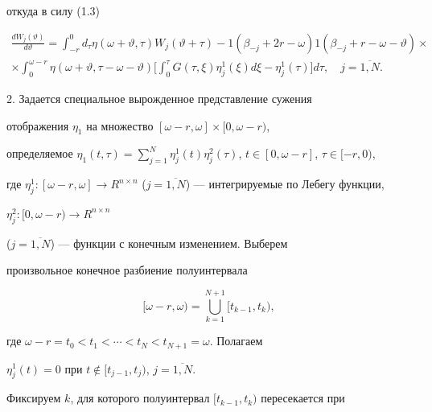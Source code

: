 откуда в силу (1.3)


\begin{multline*}


\frac{dW_{j}(\vartheta) }{d \vartheta} = \int_{-r}^{0}d_{\tau}


\eta(\omega+ \vartheta, \tau) W_{j}(\vartheta+ \tau) -


1(\beta_{-j} +2r- \omega) 1(\beta_{-j} +r- \omega- \vartheta) \times \\


%


\times \int_{0}^{\omega-r} \eta(\omega+ \vartheta, \tau- \omega- \vartheta)


\bigg[\int_{0}^{\tau}G(\tau, \xi) \eta_{j}^{1}(\xi) d \xi-


\eta_{j}^{1}(\tau)\bigg] d \tau, \quad j= \overline{1,N}.


\end{multline*}





2. Задается специальное вырожденное представление сужения


отображения $\eta_{1}$ на множество $[\omega-r, \omega] \times[0, \omega-r)$,


определяемое $ \eta_{1}(t, \tau) = \sum\limits_{j=1}^{N} \eta_{j}^{1}(t)


\eta_{j}^{2}(\tau)$, $t \in [0, \omega-r]$, $\tau \in [-r,0)$,


где $ \eta_{j}^{1} : [\omega-r, \omega] \rightarrow


R^{n \times n}$ ($j= \overline{1,N}$) --- интегрируемые по Лебегу функции,


$ \eta_{j}^{2} : [0, \omega-r) \rightarrow R^{n \times n}$


($j= \overline{1,N}$) --- функции с конечным изменением. Выберем


произвольное конечное разбиение полуинтервала


$$


[\omega-r, \omega) =


\bigcup_{k=1}^{N+1}


[t_{k-1},t_{k}),


$$


где $\omega-r=t_{0} < t_{1} <\dotsb< t_{N} < t_{N+1} = \omega$. Полагаем


$\eta_{j}^{1}(t) =0$ при $t \notin [t_{j-1},t_{j})$, $j= \overline{1,N}$.


Фиксируем $k$, для которого полуинтервал $[t_{k-1},t_{k})$ пересекается при


